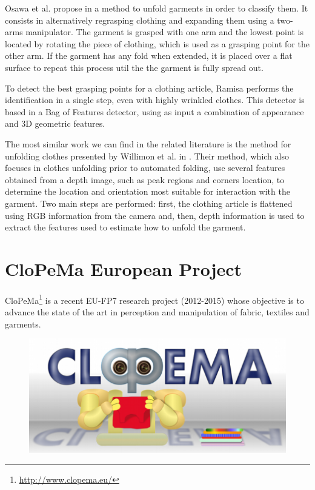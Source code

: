 Osawa et al. propose in \cite{Osawa2006} a method to unfold garments in order to classify them. It consists in alternatively regrasping clothing and expanding them using a two-arms manipulator. The garment is grasped with one arm and the lowest point is located by rotating the piece of clothing, which is used as a grasping point for the other arm. If the garment has any fold when extended, it is placed over a flat surface to repeat this process util the the garment is fully spread out.

To detect the best grasping points for a clothing article, Ramisa \cite{Ramisa2012} performs the identification in a single step, even with highly wrinkled clothes. This detector is based in a Bag of Features detector, using as input a combination of appearance and 3D geometric features.

The most similar work we can find in the related literature is the method for unfolding clothes presented by Willimon et al. in \cite{Willimon2011}. Their method, which also focuses in clothes unfolding prior to automated folding, use several features obtained from a depth image, such as peak regions and corners location, to determine the location and orientation most suitable for interaction with the garment. Two main steps are performed: first, the clothing article is flattened using RGB information from the camera and, then, depth information is used to extract the features used to estimate how to unfold the garment.

\section{CloPeMa European Project}
\label{sota:clopema}

CloPeMa\footnote{\url{http://www.clopema.eu/}} is a recent EU-FP7 research project (2012-2015) whose objective is to advance the state of the art in perception and manipulation of fabric, textiles and garments.

\begin{figure}[thpb]
    \centering
    \includegraphics[width=0.7
    \textwidth]{figures/SOTA_CloPeMa_logo.png}
    \caption{}
    \label{fig:SOTA_CloPeMa_logo}
\end{figure}

